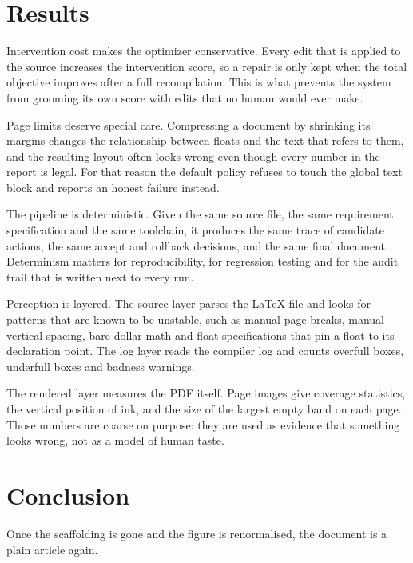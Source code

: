 \documentclass[10pt,a4paper]{article}
\begin{document}
\section{Results}
Intervention cost makes the optimizer conservative. Every edit that is applied to the source increases the intervention score, so a repair is only kept when the total objective improves after a full recompilation. This is what prevents the system from grooming its own score with edits that no human would ever make.

Page limits deserve special care. Compressing a document by shrinking its margins changes the relationship between floats and the text that refers to them, and the resulting layout often looks wrong even though every number in the report is legal. For that reason the default policy refuses to touch the global text block and reports an honest failure instead.

The pipeline is deterministic. Given the same source file, the same requirement specification and the same toolchain, it produces the same trace of candidate actions, the same accept and rollback decisions, and the same final document. Determinism matters for reproducibility, for regression testing and for the audit trail that is written next to every run.

Perception is layered. The source layer parses the LaTeX file and looks for patterns that are known to be unstable, such as manual page breaks, manual vertical spacing, bare dollar math and float specifications that pin a float to its declaration point. The log layer reads the compiler log and counts overfull boxes, underfull boxes and badness warnings.

The rendered layer measures the PDF itself. Page images give coverage statistics, the vertical position of ink, and the size of the largest empty band on each page. Those numbers are coarse on purpose: they are used as evidence that something looks wrong, not as a model of human taste.


\section{Conclusion}
Once the scaffolding is gone and the figure is renormalised, the document is a
plain article again.
\end{document}
